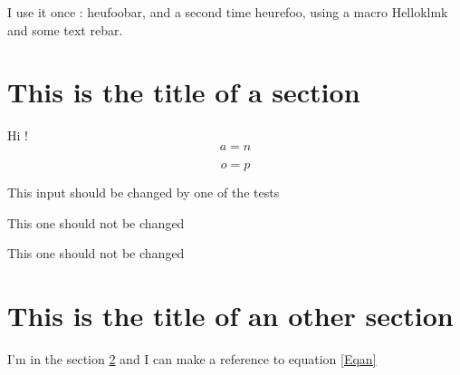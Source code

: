 \documentclass{article}
\newcommand{\MyMacro}[2]{First \emph{#1} and second {\it #2}}
\newcommand{\SecondMacro}{Hello}
\renewcommand{\MyMacro}{heu}
\begin{document}
I use it once : \MyMacro{foo}{bar}, 
and a second time  \MyMacro {refoo, using a macro 
	\SecondMacro{klmk} and some text}
	{rebar}.

\section{This is the title of a section}
\label{SecUne}

Hi !
\begin{equation}		\label{Eqan}
	a=n
\end{equation}

\begin{equation}	\label{Eqop}
	o=p
\end{equation}


This input should be changed by one of the tests

This one should not be changed


This one should not be changed


\section{This is the title of an other section}
\label{SecDeux}


I'm in the section \ref{SecDeux} and I can make a reference to equation \eqref{Eqan}

\end{document}
